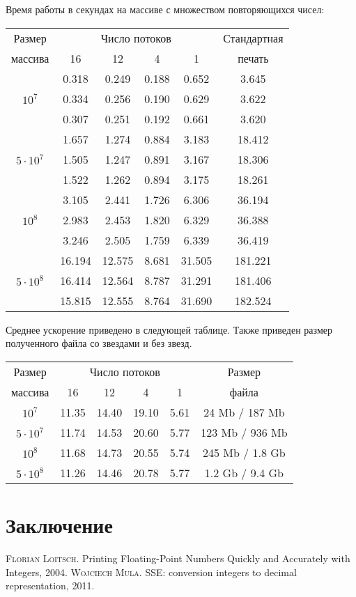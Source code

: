\documentclass[a4paper, 12pt, twoside]{article}
\begin{document}
Время работы в секундах на массиве с множеством повторяющихся чисел:
\begin{center}
\begin{tabular}{||c|c|c|c|c|c||}
\hline
\hline
Размер & \multicolumn{4}{c|}{Число потоков} & Стандартная\\
\hhline{~|-|-|-|-|~|}
массива & 16 & 12 & 4 & 1 & печать \\
\hline
\hline
& 0.318 & 0.249 & 0.188 & 0.652 & 3.645 \\
\hhline{~|-|-|-|-|-|}
$10^7$ & 0.334 & 0.256 & 0.190 & 0.629 & 3.622 \\
\hhline{~|-|-|-|-|-|}
& 0.307 & 0.251 & 0.192 & 0.661 & 3.620 \\
\hline
& 1.657 & 1.274 & 0.884 & 3.183 & 18.412 \\
\hhline{~|-|-|-|-|-|}
$5 \cdot 10^7$ & 1.505 & 1.247 & 0.891 & 3.167 & 18.306 \\
\hhline{~|-|-|-|-|-|}
& 1.522 & 1.262 & 0.894 & 3.175 & 18.261 \\
\hline
& 3.105 & 2.441 & 1.726 & 6.306 & 36.194 \\
\hhline{~|-|-|-|-|-|}
$10^8$ & 2.983 & 2.453 & 1.820 & 6.329 & 36.388 \\
\hhline{~|-|-|-|-|-|}
& 3.246 & 2.505 & 1.759 & 6.339 &  36.419 \\
\hline
& 16.194 & 12.575 & 8.681 & 31.505 & 181.221 \\
\hhline{~|-|-|-|-|-|}
$5 \cdot 10^8$ & 16.414 & 12.564 & 8.787 & 31.291 & 181.406 \\
\hhline{~|-|-|-|-|-|}
& 15.815 & 12.555  & 8.764 & 31.690 & 182.524 \\
\hline
\hline
\end{tabular}
\end{center}
Среднее ускорение приведено в следующей таблице.
Также приведен размер полученного файла со звездами и без звезд.
\begin{center}
\begin{tabular}{||c|c|c|c|c|c||}
\hline
\hline
Размер & \multicolumn{4}{c|}{Число потоков} & Размер\\
\hhline{~|-|-|-|-|~|}
массива & 16 & 12 & 4 & 1 & файла \\
\hline
$10^7$  & 11.35 & 14.40 & 19.10 & 5.61 & 24 Mb / 187 Mb \\
\hline
$5 \cdot 10^7$ &11.74 & 14.53 & 20.60 & 5.77 & 123 Mb / 936 Mb\\
\hline
$10^8$ &11.68 & 14.73 & 20.55 & 5.74 & 245 Mb / 1.8 Gb \\
\hline
$5 \cdot 10^8$ &11.26 & 14.46 & 20.78 & 5.77 & 1.2 Gb / 9.4 Gb\\
\hline
\hline
\end{tabular}
\end{center}

\section{Заключение}
\newpage

\newpage
\begin{thebibliography}{}

 \textsc{Florian Loitsch}.
Printing Floating-Point Numbers Quickly and Accurately with Integers, 2004.
 \textsc{Wojciech Mula}.
SSE: conversion integers to decimal representation, 2011.


\end{thebibliography}
\end{document}
